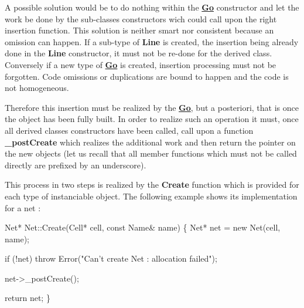 A possible solution would be to do nothing within the {\bfseries \hyperlink{classHurricane_1_1Go}{Go}} constructor and let the work be done by the sub-\/classes constructors wich could call upon the right insertion function. This solution is neither smart nor consistent because an omission can happen. If a sub-\/type of {\bfseries Line} is created, the insertion being already done in the {\bfseries Line} constructor, it must not be re-\/done for the derived class. Conversely if a new type of {\bfseries \hyperlink{classHurricane_1_1Go}{Go}} is created, insertion processing must not be forgotten. Code omissions or duplications are bound to happen and the code is not homogeneous.

Therefore this insertion must be realized by the {\bfseries \hyperlink{classHurricane_1_1Go}{Go}}, but a posteriori, that is once the object has been fully built. In order to realize such an operation it must, once all derived classes constructors have been called, call upon a function {\bfseries \-\_\-post\-Create} which realizes the additional work and then return the pointer on the new objects (let us recall that all member functions which must not be called directly are prefixed by an underscore).

This process in two steps is realized by the {\bfseries Create} function which is provided for each type of instanciable object. The following example shows its implementation for a net \-: 
\begin{DoxyCode}
Net* Net::Create(Cell* cell, \textcolor{keyword}{const} Name& name)
\{
   Net* net = \textcolor{keyword}{new} Net(cell, name);
 
   \textcolor{keywordflow}{if} (!net)
      \textcolor{keywordflow}{throw} Error(\textcolor{stringliteral}{"Can't create Net : allocation failed"});
 
   net->\_postCreate();
 
   \textcolor{keywordflow}{return} net;
\}
\end{DoxyCode}


